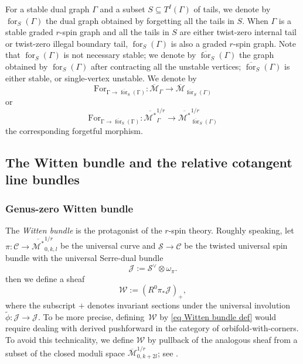 \documentclass[11pt]{amsart}
\theoremstyle{definition}
\theoremstyle{remark}
\newcommand{\<}{\left<}
\renewcommand{\>}{\right>}
\numberwithin{equation}{section}
\def\Mbar{{\overline{\mathcal M}}}
\def\Mbarstar{{\overline{\mathcal M^*}}}
\begin{document}
 For a stable dual graph $\Gamma$ and a subset $S\subseteq T^I(\Gamma)$ of tails, we denote by $\operatorname{for}_S(\Gamma)$ the dual graph obtained by forgetting all the tails in $S$. When $\Gamma$ is a stable graded $r$-spin graph and all the tails in $S$ are either twist-zero internal tail or twist-zero illegal boundary tail, $\operatorname{for}_S(\Gamma)$ is also a graded $r$-spin graph. Note that $\operatorname{for}_S(\Gamma)$ is not %
necessary stable; we %
denote by $\overline{\operatorname{for}}_S(\Gamma)$ the graph obtained by $\operatorname{for}_S(\Gamma)$ after contracting all the unstable vertices; $\overline{\operatorname{for}}_S(\Gamma)$ is either stable, or single-vertex unstable. We denote by 
 $$
 \operatorname{For_{\Gamma \to \overline{\operatorname{for}}_S(\Gamma)}}\colon \Mbar_{\Gamma}\to \Mbar_{\overline{\operatorname{for}}_S(\Gamma)}
 $$
 or 
 $$
 \operatorname{For_{\Gamma \to \overline{\operatorname{for}}_S(\Gamma)}}\colon \Mbarstar^{1/r}_{\Gamma}\to \Mbarstar^{1/r}_{\overline{\operatorname{for}}_S(\Gamma)}
 $$
 the corresponding forgetful morphism.



\subsection{The Witten bundle and the relative cotangent line bundles}
\label{subsec Witten bundle}
\subsubsection{Genus-zero Witten bundle}
The \textit{Witten bundle} is the protagonist of the $r$-spin theory. Roughly speaking, let $\pi: \mathcal{C} \to \Mbarstar_{0,k,l}^{1/r}$ be the universal curve and $\mathcal{S} \to \mathcal{C}$ be the twisted universal spin bundle with the universal Serre-dual %
bundle 
\begin{equation}\label{eq universal serre dual bundle}
\mathcal{J}:= \mathcal{S}^{\vee} \otimes \omega_{\pi}.
\end{equation}
then we %
define a sheaf
\begin{equation}
\label{eq Witten bundle def}
{\mathcal{W}}:= (R^0\pi_*\mathcal{J})_+,
\end{equation}
where the subscript $+$ denotes invariant sections under the universal involution $\widetilde{\phi}: \mathcal{J} \to \mathcal{J}.$ 
To be more precise, defining~${\mathcal{W}}$ by \eqref{eq Witten bundle def} would require dealing with derived pushforward in the category of orbifold-with-corners. To avoid this technicality, we define ${\mathcal{W}}$ by pullback of the analogous sheaf from a subset of the closed moduli space $\Mbar_{0,k+2l}^{1/r}$; see \cite[\S 4.1]{BCT1}. 
\end{document}
